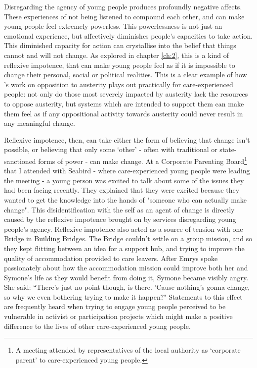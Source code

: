Disregarding the agency of young people produces profoundly negative affects. These experiences of not being listened to compound each other, and can make young people feel extremely powerless. This powerlessness is not just an emotional experience, but affectively diminishes people’s capacities to take action. This diminished capacity for action can crystallise into the belief that things cannot and will not change. As explored in chapter \ref{ch:2}, this is a kind of reflexive impotence, that can make young people feel as if it is impossible to change their personal, social or political realities. This is a clear example of how \citet{harrison_cant_2020}’s work on opposition to austerity plays out practically for care-experienced people: not only do those most severely impacted by austerity lack the resources to oppose austerity, but systems which are intended to support them can make them feel as if any oppositional activity towards austerity could never result in any meaningful change. 

Reflexive impotence, then, can take either the form of believing that change isn’t possible, or believing that only some ‘other’ - often with traditional or state-sanctioned forms of power - can make change. At a Corporate Parenting Board\footnote{A meeting attended by representatives of the local authority as ‘corporate parent’ to care-experienced young people.} that I attended with Seabird - where care-experienced young people were leading the meeting - a young person was excited to talk about some of the issues they had been facing recently. They explained that they were excited because they wanted to get the knowledge into the hands of "someone who can actually make change".  This disidentification with the self as an agent of change is directly caused by the reflexive impotence brought on by services disregarding young people’s agency. Reflexive impotence also acted as a source of tension with one Bridge in Building Bridges. The Bridge couldn’t settle on a  group mission, and so they kept flitting between an idea for a support hub, and trying to improve the quality of accommodation provided to care leavers. After Emrys spoke passionately about how the accommodation mission could improve both her and Symone's life as they would benefit from doing it, Symone became visibly angry. She said: “There's just no point though, is there. 'Cause nothing's gonna change, so why we even bothering trying to make it happen?" Statements to this effect are frequently heard when trying to engage young people perceived to be vulnerable in activist or participation projects which might make a positive difference to the lives of other care-experienced young people. 

